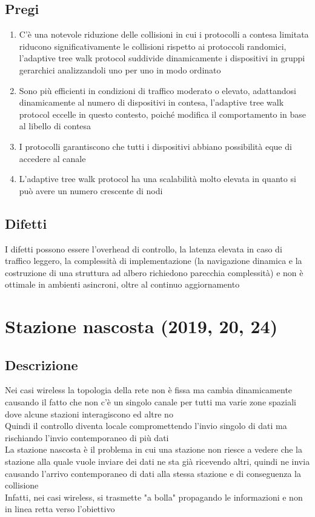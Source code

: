 \documentclass[10pt,oneside,a4paper]{article}
\begin{document}
\subsection{Pregi}
\begin{enumerate}
\item C'è una notevole riduzione delle collisioni in cui i protocolli a contesa limitata riducono significativamente le collisioni rispetto ai protoccoli randomici, l'adaptive tree walk protocol suddivide dinamicamente i dispositivi in gruppi gerarchici analizzandoli uno per uno in modo ordinato
\item Sono più efficienti in condizioni di traffico moderato o elevato, adattandosi dinamicamente al numero di dispositivi in contesa, l'adaptive tree walk protocol eccelle in questo contesto, poiché modifica il comportamento in base al libello di contesa
\item I protocolli garantiscono che tutti i dispositivi abbiano possibilità eque di accedere al canale
\item L'adaptive tree walk protocol ha una scalabilità molto elevata in quanto si può avere un numero crescente di nodi
\end{enumerate}
\subsection{Difetti}
I difetti possono essere l'overhead di controllo, la latenza elevata in caso di traffico leggero, la complessità di implementazione (la navigazione dinamica e la costruzione di una struttura ad albero richiedono parecchia complessità) e non è ottimale in ambienti asincroni, oltre al continuo aggiornamento
\section{Stazione nascosta (2019, 20, 24)}
\subsection{Descrizione}
Nei casi wireless la topologia della rete non è fissa ma cambia dinamicamente causando il fatto che non c'è un singolo canale per tutti ma varie zone spaziali dove alcune stazioni interagiscono ed altre no\\
Quindi il controllo diventa locale compromettendo l'invio singolo di dati ma rischiando l'invio contemporaneo di più dati\\
La stazione nascosta è il problema in cui una stazione non riesce a vedere che la stazione alla quale vuole inviare dei dati ne sta già ricevendo altri, quindi ne invia causando l'arrivo contemporaneo di dati alla stessa stazione e di conseguenza la collisione\\
Infatti, nei casi wireless, si trasmette "a bolla" propagando le informazioni e non in linea retta verso l'obiettivo
\end{document}
